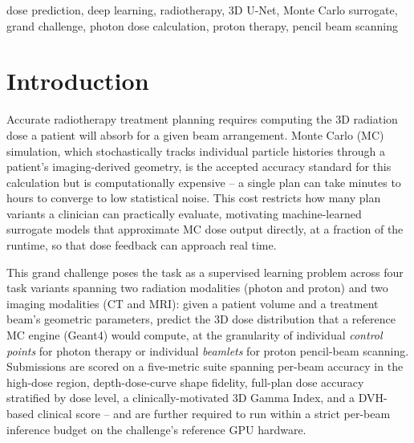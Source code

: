 \documentclass[10pt,conference]{IEEEtran}
\begin{document}
\begin{IEEEkeywords}
dose prediction, deep learning, radiotherapy, 3D U-Net, Monte Carlo
surrogate, grand challenge, photon dose calculation, proton therapy,
pencil beam scanning
\end{IEEEkeywords}

\section{Introduction}

Accurate radiotherapy treatment planning requires computing the 3D
radiation dose a patient will absorb for a given beam arrangement.
Monte Carlo (MC) simulation, which stochastically tracks individual
particle histories through a patient's imaging-derived geometry, is the
accepted accuracy standard for this calculation but is computationally
expensive -- a single plan can take minutes to hours to converge to low
statistical noise. This cost restricts how many plan variants a
clinician can practically evaluate, motivating machine-learned surrogate
models that approximate MC dose output directly, at a fraction of the
runtime, so that dose feedback can approach real time.

This grand challenge poses the task as a supervised learning
problem across four task variants spanning two radiation modalities
(photon and proton) and two imaging modalities (CT and MRI): given a
patient volume and a treatment beam's geometric parameters, predict the
3D dose distribution that a reference MC engine (Geant4) would compute,
at the granularity of individual \emph{control points} for photon
therapy or individual \emph{beamlets} for proton pencil-beam scanning.
Submissions are scored on a five-metric suite spanning per-beam accuracy
in the high-dose region, depth-dose-curve shape fidelity, full-plan dose
accuracy stratified by dose level, a clinically-motivated 3D Gamma
Index, and a DVH-based clinical score -- and are further required to run
within a strict per-beam inference budget on the challenge's reference
GPU hardware.
\end{document}
